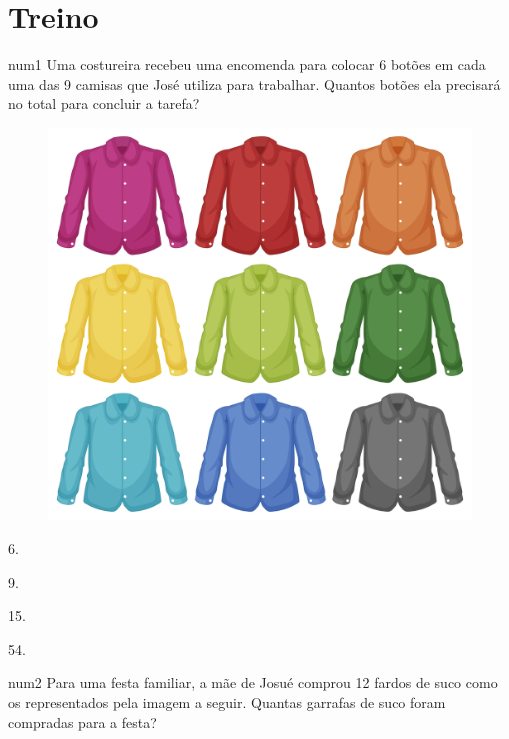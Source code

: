 \section*{Treino}

num{1} Uma costureira recebeu uma encomenda para colocar 6 botões em
cada uma das 9 camisas que José utiliza para trabalhar. Quantos botões
ela precisará no total para concluir a tarefa?

\begin{figure}[htpb!]
\centering
\includegraphics[width=.8\textwidth]{./media/image16d.jpeg}
\end{figure}

\begin{escolha}
    \item 6.
    \item 9.
    \item 15.
    \item 54.
\end{escolha}

\pagebreak

num{2} Para uma festa familiar, a mãe de Josué comprou 12 fardos de
suco como os representados pela imagem a seguir. Quantas garrafas de suco foram compradas para a festa? 

